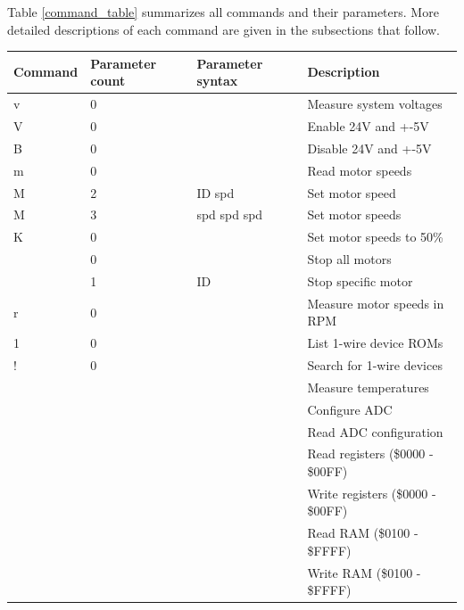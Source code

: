 \documentclass{article}
\begin{document}
Table \vref{command_table} summarizes all commands and their parameters.
More detailed descriptions of each command are given in the subsections that follow.


\begin{table}[H]
\begin{centering}
\begin{tabular}{|p{1.8cm}|p{1.8cm}|p{1.8cm}|p{5cm}|}
\hline
{\bf Command} & {\bf Parameter count} & {\bf Parameter syntax} & {\bf Description} \\ \hline
v & 0 &                     & Measure system voltages \\ \hline
V & 0 &                     & Enable 24V and +-5V \\ \hline
B & 0 &                     & Disable 24V and +-5V \\ \hline
m & 0 &                     & Read motor speeds \\ \hline
M & 2 & ID spd              & Set motor speed \\ \hline
M & 3 & spd spd spd         & Set motor speeds \\ \hline
K & 0 &                     & Set motor speeds to 50\% \\ \hline
  & 0 &                     & Stop all motors \\ \hline
  & 1 & ID                  & Stop specific motor \\ \hline
r & 0 &                     & Measure motor speeds in RPM \\ \hline
1 & 0 &                     & List 1-wire device ROMs \\ \hline
! & 0 &                     & Search for 1-wire devices \\ \hline
  &   &                     & Measure temperatures \\ \hline
  &   &                     & Configure ADC \\ \hline
  &   &                     & Read ADC configuration \\ \hline
  &   &                     & Read registers (\$0000 - \$00FF) \\ \hline
  &   &                     & Write registers (\$0000 - \$00FF) \\ \hline
  &   &                     & Read RAM (\$0100 - \$FFFF) \\ \hline
  &   &                     & Write RAM (\$0100 - \$FFFF) \\ \hline

\end{tabular}
\end{centering}
\end{table}
\end{document}
